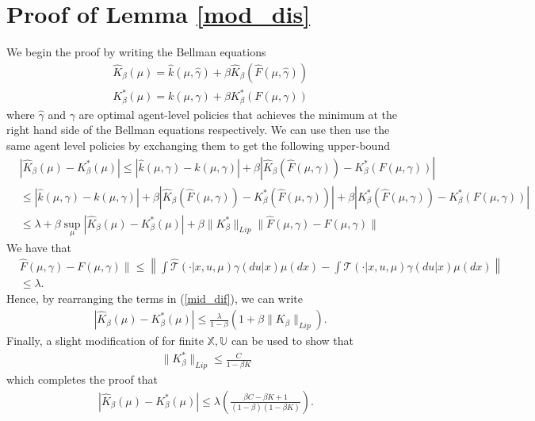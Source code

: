 \documentclass[twoside,11pt]{article}
\begin{document}
\section{Proof of Lemma \ref{mod_dis}}\label{mod_dis_proof}
We begin the proof by writing the Bellman equations
\begin{align*}
&\hat{K}_\beta(\mu) = \hat{k}(\mu,\hat{\gamma}) + \beta \hat{K}_\beta(\hat{F}(\mu,\hat{\gamma}))\\
& K_\beta^*(\mu) = k(\mu,\gamma) +\beta K_\beta^*(F(\mu,\gamma))
\end{align*}
where $\hat{\gamma}$ and $\gamma$ are optimal agent-level policies that achieves the minimum at the right hand side of the Bellman equations respectively. We can use then use the same agent level policies by exchanging them to get the following upper-bound 
\begin{align}\label{mid_dif}
&\left| \hat{K}_\beta (\mu) - K_\beta^*(\mu)\right| \leq |\hat{k}(\mu,\gamma) - k(\mu,\gamma)| + \beta \left| \hat{K}_\beta(\hat{F}(\mu,\gamma)) - K_\beta^*(F(\mu,\gamma))\right|\nonumber\\
&\leq  |\hat{k}(\mu,\gamma) - k(\mu,\gamma)| + \beta \left| \hat{K}_\beta(\hat{F}(\mu,\gamma)) - K_\beta^*(\hat{F}(\mu,\gamma))\right|+ \beta  \left| {K}^*_\beta(\hat{F}(\mu,\gamma)) - K_\beta^*({F}(\mu,\gamma))\right|\nonumber\\
&\leq \lambda + \beta \sup_\mu\left| \hat{K}_\beta (\mu) - K_\beta^*(\mu)\right|  + \beta \|K_\beta^*\|_{Lip} \| \hat{F}(\mu,\gamma) - F(\mu,\gamma)\|
\end{align}
We have that 
\begin{align*}
& \hat{F}(\mu,\gamma) - F(\mu,\gamma)\| \leq \left\| \int \hat{\mathcal{T}}(\cdot|x,u,\mu)\gamma(du|x)\mu(dx) -  \int \mathcal{T}(\cdot|x,u,\mu)\gamma(du|x)\mu(dx)  \right\|\\
&\leq \lambda.
\end{align*}
Hence, by rearranging the terms in (\ref{mid_dif}), we can write
\begin{align*}
&\left| \hat{K}_\beta (\mu) - K_\beta^*(\mu)\right| \leq \frac{\lambda}{1-\beta} \left( 1+\beta \|K_\beta\|_{Lip} \right).
\end{align*}
Finally, a slight modification of \cite[Lemma 6]{bayraktar2023finite} for finite $\mathds{X},\mathds{U}$  can be used to show that
\begin{align*}
\|K_\beta^*\|_{Lip} \leq \frac{C}{1-\beta K}
\end{align*} 
which completes the proof that
\begin{align*}
\left| \hat{K}_\beta (\mu) - K_\beta^*(\mu)\right| \leq \lambda\left( \frac{\beta C- \beta K +1}{(1-\beta)(1-\beta K)}  \right).
\end{align*}
\end{document}
